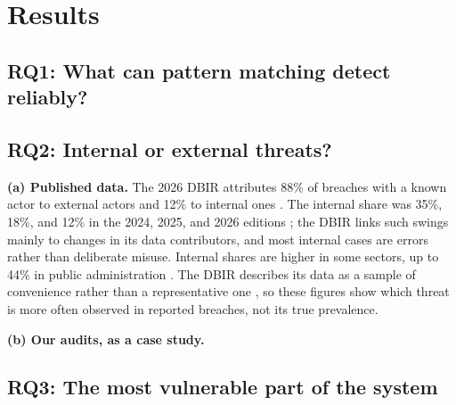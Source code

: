 \section{Results}

\subsection{RQ1: What can pattern matching detect reliably?}

\subsection{RQ2: Internal or external threats?}
\textbf{(a) Published data.} The 2026 DBIR attributes 88\% of breaches with a known actor to external actors and 12\% to internal ones \cite{dbir2026}. The internal share was 35\%, 18\%, and 12\% in the 2024, 2025, and 2026 editions \cite{dbir2024,dbir2025,dbir2026}; the DBIR links such swings mainly to changes in its data contributors, and most internal cases are errors rather than deliberate misuse. Internal shares are higher in some sectors, up to 44\% in public administration \cite{dbir2026}. The DBIR describes its data as a sample of convenience rather than a representative one \cite{dbir2026}, so these figures show which threat is more often observed in reported breaches, not its true prevalence.

\textbf{(b) Our audits, as a case study.} 

\subsection{RQ3: The most vulnerable part of the system}
